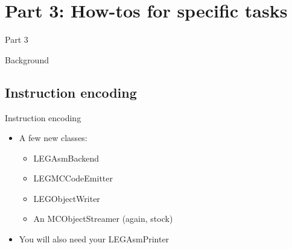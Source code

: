 \section{Part 3: How-tos for specific tasks}

\begin{frame}{Part 3}

Background

\end{frame}


\subsection{Instruction encoding}

\begin{frame}{Instruction encoding}

\begin{itemize}
    \item A few new classes:
    \begin{itemize}
        \item LEGAsmBackend
        \item LEGMCCodeEmitter
        \item LEGObjectWriter
        \item An MCObjectStreamer (again, stock)
    \end{itemize}
    \item You will also need your LEGAsmPrinter
\end{itemize}

\end{frame}


